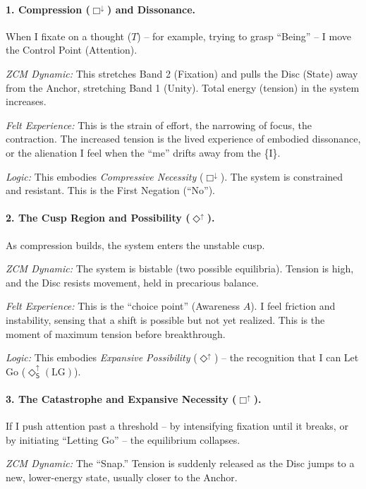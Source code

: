 \documentclass[12pt]{book}
\newcommand{\SDiaUp}{\Diamond_{\mathsf{S}}^{\uparrow}}
\begin{document}
\paragraph{1. Compression ($\Box^{\downarrow}$) and Dissonance.}

When I fixate on a thought ($T$) -- for example, trying to grasp ``Being'' -- I move the Control Point (Attention).

\textit{ZCM Dynamic:} This stretches Band 2 (Fixation) and pulls the Disc (State) away from the Anchor, stretching Band 1 (Unity). Total energy (tension) in the system increases.

\textit{Felt Experience:} This is the strain of effort, the narrowing of focus, the contraction. The increased tension is the lived experience of embodied dissonance, or the alienation I feel when the ``me'' drifts away from the \{I\}.

\textit{Logic:} This embodies \textit{Compressive Necessity} ($\Box^{\downarrow}$). The system is constrained and resistant. This is the First Negation (``No'').

\paragraph{2. The Cusp Region and Possibility ($\Diamond^{\uparrow}$).}

As compression builds, the system enters the unstable cusp.

\textit{ZCM Dynamic:} The system is bistable (two possible equilibria). Tension is high, and the Disc resists movement, held in precarious balance.

\textit{Felt Experience:} This is the ``choice point'' (Awareness $A$). I feel friction and instability, sensing that a shift is possible but not yet realized. This is the moment of maximum tension before breakthrough.

\textit{Logic:} This embodies \textit{Expansive Possibility} ($\Diamond^{\uparrow}$) -- the recognition that I can Let Go ($\SDiaUp(\mathrm{LG})$).

\paragraph{3. The Catastrophe and Expansive Necessity ($\Box^{\uparrow}$).}

If I push attention past a threshold -- by intensifying fixation until it breaks, or by initiating ``Letting Go'' -- the equilibrium collapses.

\textit{ZCM Dynamic:} The ``Snap.'' Tension is suddenly released as the Disc jumps to a new, lower-energy state, usually closer to the Anchor.
\end{document}
